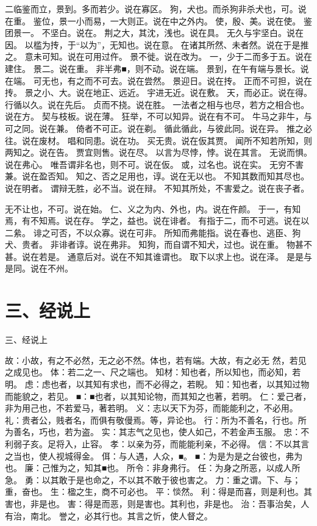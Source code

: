 \documentclass[12pt,UTF8]{ctexbook}
\begin{document}
二临鉴而立，景到。多而若少。说在寡区。 
狗，犬也。而杀狗非杀犬也，可。说在重。 
鉴位，景一小而易，一大则正。说在中之外内。 
使，殷、美。说在使。 
鉴团景一。 
不坚白。说在。 
荆之大，其沈，浅也。说在具。 
无久与宇坚白。说在因。 
以槛为抟，于“以为”，无知也。说在意。 
在诸其所然、未者然。说在于是推之。 
意未可知。说在可用过仵。 
景不徙。说在改为。 
一，少于二而多于五。说在建住。 
景二。说在重。 
非半弗■，则不动。说在端。 
景到，在午有端与景长。说在端。 
可无也，有之而不可去。说在尝然。 
景迎日。说在抟。 
正而不可担，说在抟。 
景之小、大。说在地正、远近。 
宇进无近。说在敷。 
天，而必正。说在得。 
行循以久。说在先后。 
贞而不挠。说在胜。 
一法者之相与也尽，若方之相合也。说在方。 
契与枝板。说在薄。 
狂举，不可以知异。说在有不可。 
牛马之非牛，与可之同。说在兼。 
倚者不可正。说在剃。 
循此循此，与彼此同。说在异。 
推之必往。说在废材。 
唱和同患。说在功。 
买无贵。说在仮其贾。 
闻所不知若所知，则两知之。说在告。 
贾宜则售。说在尽。 
以言为尽悖，悖。说在其言。 
无说而惧。说在弗心。 
唯吾谓非名也，则不可。说在仮。 
或，过名也。说在实。 
无穷不害兼。说在盈否知。 
知之、否之足用也，谆。说在无以也。 
不知其数而知其尽也。说在明者。 
谓辩无胜，必不当。说在辩。 
不知其所处，不害爱之。说在丧子者。 

无不让也，不可。说在始。 
仁、义之为内、外也，内。说在仵颜。 
于一，有知焉，有不知焉。说在存。 
学之，益也。说在诽者。 
有指于二，而不可逃。说在以二絫。 
诽之可否，不以众寡。说在可非。 
所知而弗能指。说在春也、逃臣、狗犬、贵者。 
非诽者谆。说在弗非。 
知狗，而自谓不知犬，过也。说在重。 
物甚不甚。说在若是。 
通意后对。说在不知其谁谓也。 
取下以求上也。说在泽。 
是是与是同。说在不州。 


\chapter{三、经说上}

三、经说上

故：小故，有之不必然，无之必不然。体也，若有端。大故，有之必无 
然，若见之成见也。 
体：若二之一、尺之端也。 
知材：知也者，所以知也，而必知，若明。 
虑：虑也者，以其知有求也，而不必得之，若睨。 
知：知也者，以其知过物而能貌之，若见。 
■：■也者，以其知论物，而其知之也著，若明。 
仁：爱己者，非为用己也，不若爱马，著若明。 
义：志以天下为芬，而能能利之，不必用。 
礼：贵者公，贱者名，而俱有敬僈焉。等，异论也。 
行：所为不善名，行也。所为善名，巧也，若为盗。 
实：其志气之见也，使人如己，不若金声玉服。 
忠：不利弱子亥。足将入，止容。 
孝：以亲为芬，而能能利亲，不必得。 
信：不以其言之当也，使人视城得金。 
佴：与人遇，人众，■。 
■：为是为是之台彼也，弗为也。 
廉：己惟为之，知其■也。 
所令：非身弗行。 
任：为身之所恶，以成人所急。 
勇：以其敢于是也命之，不以其不敢于彼也害之。 
力：重之谓。下、与；重，奋也。 
生：楹之生，商不可必也。 
平：惔然。 
利：得是而喜，则是利也。其害也，非是也。 
害：得是而恶，则是害也。其利也，非是也。 
治：吾事治矣，人有治，南北。 
誉之，必其行也。其言之忻，使人督之。 
\end{document}
